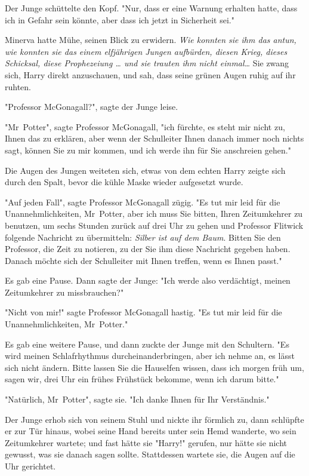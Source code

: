 {Der Junge schüttelte den Kopf. "Nur, dass er eine Warnung erhalten hatte, dass ich in Gefahr sein könnte, aber dass ich jetzt in Sicherheit sei."

Minerva hatte Mühe, seinen Blick zu erwidern. \emph{Wie konnten sie ihm das antun, wie konnten sie das einem elfjährigen Jungen aufbürden, diesen Krieg, dieses Schicksal, diese Prophezeiung … und sie trauten ihm nicht einmal…} Sie zwang sich, Harry direkt anzuschauen, und sah, dass seine grünen Augen ruhig auf ihr ruhten.

"Professor McGonagall?", sagte der Junge leise.

"Mr~Potter", sagte Professor McGonagall, "ich fürchte, es steht mir nicht zu, Ihnen das zu erklären, aber wenn der Schulleiter Ihnen danach immer noch nichts sagt, können Sie zu mir kommen, und ich werde ihn für Sie anschreien gehen."

Die Augen des Jungen weiteten sich, etwas von dem echten Harry zeigte sich durch den Spalt, bevor die kühle Maske wieder aufgesetzt wurde.

"Auf jeden Fall", sagte Professor McGonagall zügig. "Es tut mir leid für die Unannehmlichkeiten, Mr~Potter, aber ich muss Sie bitten, Ihren Zeitumkehrer zu benutzen, um sechs Stunden zurück auf drei Uhr zu gehen und Professor Flitwick folgende Nachricht zu übermitteln: \emph{Silber ist auf dem Baum}. Bitten Sie den Professor, die Zeit zu notieren, zu der Sie ihm diese Nachricht gegeben haben. Danach möchte sich der Schulleiter mit Ihnen treffen, wenn es Ihnen passt."

Es gab eine Pause. Dann sagte der Junge: "Ich werde also verdächtigt, meinen Zeitumkehrer zu missbrauchen?"

"Nicht von mir!" sagte Professor McGonagall hastig. "Es tut mir leid für die Unannehmlichkeiten, Mr~Potter."

Es gab eine weitere Pause, und dann zuckte der Junge mit den Schultern. "Es wird meinen Schlafrhythmus durcheinanderbringen, aber ich nehme an, es lässt sich nicht ändern. Bitte lassen Sie die Hauselfen wissen, dass ich morgen früh um, sagen wir, drei Uhr ein frühes Frühstück bekomme, wenn ich darum bitte."

"Natürlich, Mr~Potter", sagte sie. "Ich danke Ihnen für Ihr Verständnis."

Der Junge erhob sich von seinem Stuhl und nickte ihr förmlich zu, dann schlüpfte er zur Tür hinaus, wobei seine Hand bereits unter sein Hemd wanderte, wo sein Zeitumkehrer wartete; und fast hätte sie "Harry!" gerufen, nur hätte sie nicht gewusst, was sie danach sagen sollte. Stattdessen wartete sie, die Augen auf die Uhr gerichtet.

}

